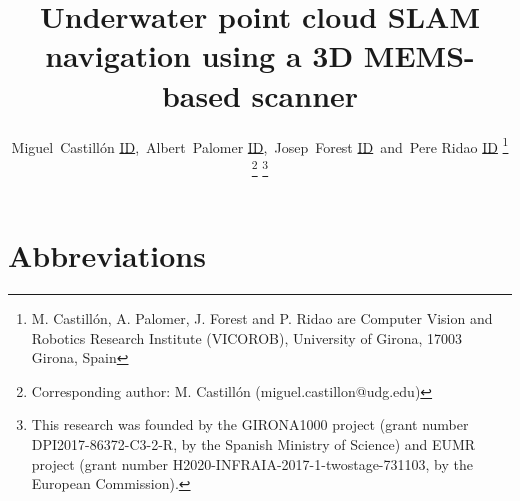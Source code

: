 \documentclass[a4paper,10pt,twocolumn]{article}
\begin{document}
\title{Underwater point cloud SLAM navigation using a 3D MEMS-based scanner}
\author{Miguel~Castillón \href{https://orcid.org/0000-0002-2919-4828}{ID},~Albert~Palomer \href{https://orcid.org/0000-0002-7507-5088}{ID},~Josep~Forest \href{https://orcid.org/0000-0002-4868-5884}{ID}~and~Pere Ridao \href{https://orcid.org/0000-0002-1724-3012}{ID}%
\thanks{M. Castillón, A. Palomer, J. Forest and P. Ridao are Computer Vision and Robotics Research Institute (VICOROB), University of Girona, 17003 Girona, Spain}%
\thanks{Corresponding author: M. Castillón (miguel.castillon@udg.edu)}%
\thanks{This research was founded by the GIRONA1000 project (grant number DPI2017-86372-C3-2-R, by the Spanish Ministry of Science) and EUMR project (grant number H2020-INFRAIA-2017-1-twostage-731103, by the European Commission).}}%


\maketitle


% 
% 
% 
% 
% 
% 


\section*{Abbreviations}

 



\end{document}
